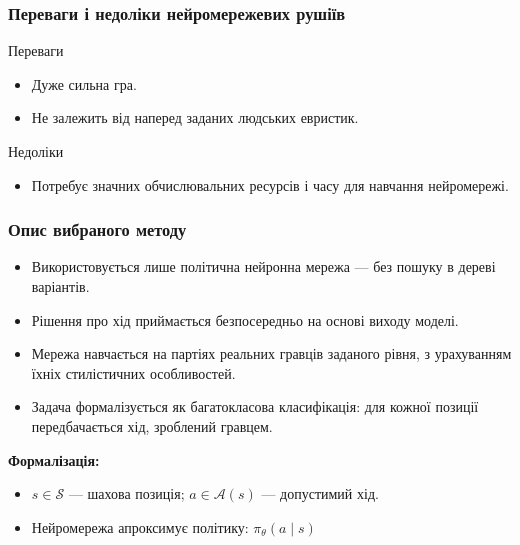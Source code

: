 \documentclass[
    10pt,
]{beamer}
\begin{document}
\begin{frame}[t]
    \frametitle{Переваги і недоліки нейромережевих рушіїв}
    \begin{block}{Переваги}
        \begin{itemize}
            \item Дуже сильна гра.
            \item Не залежить від наперед заданих людських евристик.
        \end{itemize}
    \end{block}

    \begin{block}{Недоліки}
        \begin{itemize}
            \item Потребує значних обчислювальних ресурсів і часу для навчання нейромережі.
        \end{itemize}
    \end{block}
\end{frame}


\begin{frame}[t]
    \frametitle{Опис вибраного методу}

    \begin{itemize}
        \item Використовується лише політична нейронна мережа — без пошуку в дереві варіантів.
        \item Рішення про хід приймається безпосередньо на основі виходу моделі.
        \item Мережа навчається на партіях реальних гравців заданого рівня, з урахуванням їхніх стилістичних особливостей.
        \item Задача формалізується як багатокласова класифікація: для кожної позиції передбачається хід, зроблений гравцем.
    \end{itemize}

    \vspace{4mm}
    \textbf{Формалізація:}

    \begin{itemize}
        \item \(s \in \mathcal{S}\) — шахова позиція; \quad \(a \in \mathcal{A}(s)\) — допустимий хід.
        \item Нейромережа апроксимує політику: \(\pi_\theta(a \mid s)\)
    \end{itemize}
\end{frame}
\end{document}
